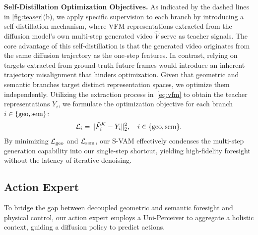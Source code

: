 \documentclass[runningheads]{llncs}
\begin{document}
\noindent \textbf{Self-Distillation Optimization Objectives.}
As indicated by the dashed lines in \cref{fig:teaser}(b), we apply specific supervision to each branch by introducing a self-distillation mechanism, where VFM representations extracted from the diffusion model's own multi-step generated video $\hat{V}$ serve as teacher signals. The core advantage of this self-distillation is that the generated video originates from the same diffusion trajectory as the one-step features. In contrast, relying on targets extracted from ground-truth future frames would introduce an inherent trajectory misalignment that hinders optimization. Given that geometric and semantic branches target distinct representation spaces, we optimize them independently. Utilizing the extraction process in~\cref{eq:vfm} to obtain the teacher representations $Y_{i}$, we formulate the optimization objective for each branch $i \in \{\textnormal{geo}, \textnormal{sem}\}$:
\begin{equation}
    \mathcal{L}_{i} = \| \tilde{F}_{i}^K - Y_{i} \|_2^2, \quad i \in \{\textnormal{geo}, \textnormal{sem}\}. 
    \label{eq:distill_loss}
\end{equation}
By minimizing $\mathcal{L}_\textnormal{geo}$ and $\mathcal{L}_\textnormal{sem}$, our S-VAM effectively condenses the multi-step generation capability into our single-step shortcut, yielding high-fidelity foresight without the latency of iterative denoising.




\subsection{Action Expert}
\label{sec:ae}
To bridge the gap between decoupled geometric and semantic foresight and physical control, our action expert employs a Uni-Perceiver to aggregate a holistic context, guiding a diffusion policy to predict actions.
\end{document}
